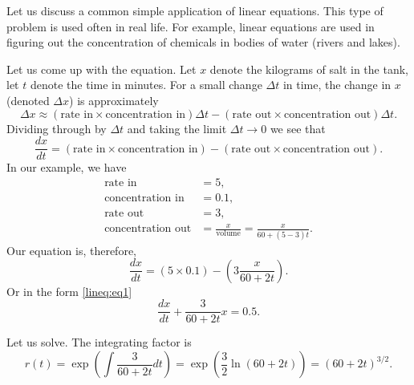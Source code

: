 \medskip

Let us discuss a common
simple application of linear equations.
This type of 
problem is used often in real life.
For example, linear equations are used in
figuring out the concentration of
chemicals in bodies of water (rivers and lakes).\\

\pagebreak

{Let us come up with the equation.  Let $x$ denote the kilograms of salt in the tank,
let $t$ denote the time in minutes.  For a small change $\Delta t$ in
time, the change in $x$ (denoted $\Delta x$) is approximately
\begin{equation*}
\Delta x \approx
(\text{rate in} \times \text{concentration in}) \Delta t - 
(\text{rate out} \times \text{concentration out}) \Delta t .
\end{equation*}
Dividing through by $\Delta t$ and
taking the limit $\Delta t \to 0$ we see that
\begin{equation*}
\frac{dx}{dt} =
(\text{rate in} \times \text{concentration in})  - 
(\text{rate out} \times \text{concentration out}) .
\end{equation*}
In our example, we have
\begin{align*}
\text{rate in} &= 5 , \\
\text{concentration in} &= 0.1 , \\
\text{rate out} &= 3 , \\
\text{concentration out} &= \frac{x}{\text{volume}} = \frac{x}{60+(5-3)t} .
\end{align*}
Our equation is, therefore,
\begin{equation*}
\frac{dx}{dt} =
(5 \times 0.1)  - 
\left(3 \frac{x}{60+2t}\right) .
\end{equation*}
Or in the form \eqref{lineq:eq1}
\begin{equation*}
\frac{dx}{dt} +
\frac{3}{60+2t} x
=
0.5 .
\end{equation*}

Let us solve.  The integrating factor is
\begin{equation*}
r(t) = \exp \left( \int \frac{3}{60+2t} dt  \right)
=
\exp \left( \frac{3}{2} \ln (60+2t) \right)
=
{(60+2t)}^{3/2} .
\end{equation*}

}
